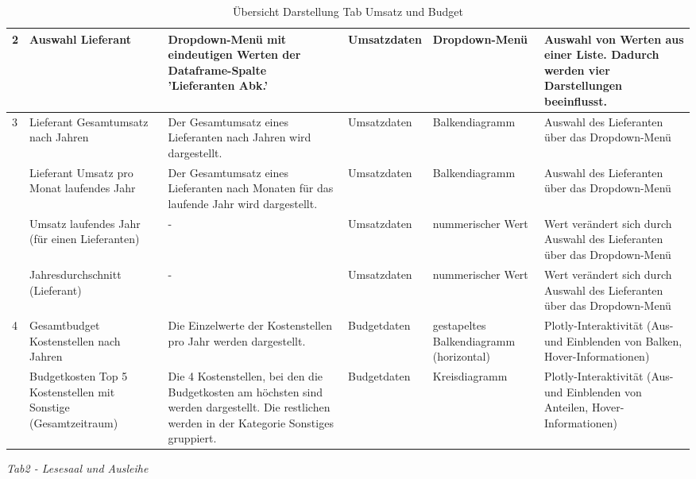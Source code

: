 \begin{table}[H]
\begin{adjustbox}{max width=\textwidth}
\begin{tabular}{p{}p{}p{}p{}p{}p{}}
                        \midrule
            2           &Auswahl  Lieferant &Dropdown-Menü mit eindeutigen Werten der Dataframe-Spalte 'Lieferanten Abk.'&Umsatzdaten&Dropdown-Menü &Auswahl von Werten aus einer Liste. Dadurch werden vier Darstellungen beeinflusst.\\
            \midrule
            3           &Lieferant Gesamtumsatz nach Jahren&Der Gesamtumsatz eines Lieferanten nach Jahren wird dargestellt.   &Umsatzdaten    &Balkendiagramm    &Auswahl des Lieferanten über das Dropdown-Menü\\
                        &Lieferant Umsatz pro Monat laufendes Jahr&Der Gesamtumsatz eines Lieferanten nach Monaten für das laufende Jahr wird dargestellt.   &Umsatzdaten    &Balkendiagramm    &Auswahl des Lieferanten über das Dropdown-Menü\\
                        &Umsatz laufendes Jahr (für einen Lieferanten)&- &Umsatzdaten    &nummerischer Wert    &Wert verändert sich durch Auswahl des Lieferanten über das Dropdown-Menü\\
                        &Jahresdurchschnitt (Lieferant)&- &Umsatzdaten    &nummerischer Wert    &Wert verändert sich durch Auswahl des Lieferanten über das Dropdown-Menü\\
            \midrule
            4           &Gesamtbudget Kostenstellen nach Jahren&Die Einzelwerte der Kostenstellen pro Jahr werden dargestellt.&Budgetdaten    &gestapeltes Balkendiagramm (horizontal)    &Plotly-Interaktivität (Aus- und Einblenden von Balken, Hover-Informationen)\\
                        &Budgetkosten Top 5 Kostenstellen mit Sonstige (Gesamtzeitraum)&Die 4 Kostenstellen, bei den die Budgetkosten am höchsten sind werden dargestellt. Die restlichen werden in der Kategorie Sonstiges gruppiert. &Budgetdaten    &Kreisdiagramm    &Plotly-Interaktivität (Aus- und Einblenden von Anteilen, Hover-Informationen)\\

        \bottomrule
        \end{tabular}
        \end{adjustbox}
        \caption{%
            Übersicht Darstellung Tab Umsatz und Budget
        }
        \label{tab:Darstellung Tab Umsatz und Budget}
        \end{table}
    \endgroup
    


\clearpage
\noindent
\textit{Tab2 - Lesesaal und Ausleihe}

